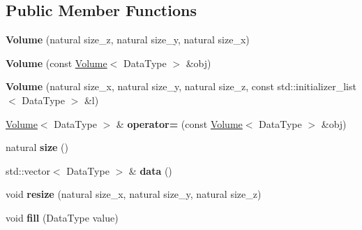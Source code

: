 \subsection*{Public Member Functions}
\begin{DoxyCompactItemize}
\item 
\mbox{\label{classez_1_1maths_1_1Volume_a6ed04fb352180b0df36dfbee44819fe5}} 
{\bfseries Volume} (natural size\+\_\+z, natural size\+\_\+y, natural size\+\_\+x)
\item 
\mbox{\label{classez_1_1maths_1_1Volume_ae60ce595d5f72cd2dc34a0fb68b40312}} 
{\bfseries Volume} (const \hyperlink{classez_1_1maths_1_1Volume}{Volume}$<$ Data\+Type $>$ \&obj)
\item 
\mbox{\label{classez_1_1maths_1_1Volume_a635a4b9847ee841827cca77a59fd0394}} 
{\bfseries Volume} (natural size\+\_\+x, natural size\+\_\+y, natural size\+\_\+z, const std\+::initializer\+\_\+list$<$ Data\+Type $>$ \&l)
\item 
\mbox{\label{classez_1_1maths_1_1Volume_a0ab8d8d13b2ab61d8e2ab590cfc56cb2}} 
\hyperlink{classez_1_1maths_1_1Volume}{Volume}$<$ Data\+Type $>$ \& {\bfseries operator=} (const \hyperlink{classez_1_1maths_1_1Volume}{Volume}$<$ Data\+Type $>$ \&obj)
\item 
\mbox{\label{classez_1_1maths_1_1Volume_a14d0632e4a340a636681139d05992e8e}} 
natural {\bfseries size} ()
\item 
\mbox{\label{classez_1_1maths_1_1Volume_ab53fad2aa3ad7e1660adfc9aa2675c92}} 
std\+::vector$<$ Data\+Type $>$ \& {\bfseries data} ()
\item 
\mbox{\label{classez_1_1maths_1_1Volume_adc78e170c736193ad74ab699126edf3f}} 
void {\bfseries resize} (natural size\+\_\+x, natural size\+\_\+y, natural size\+\_\+z)
\item 
\mbox{\label{classez_1_1maths_1_1Volume_ac6ed242a2eaced17fd9aa74a68c308d8}} 
void {\bfseries fill} (Data\+Type value)
\item 
\mbox{\label{classez_1_1maths_1_1Volume_ad585005fb2172ebb732a29166d898e50}} 

\end{DoxyCompactItemize}
